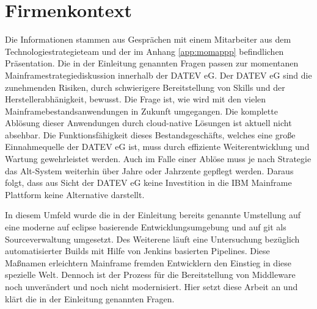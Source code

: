 \chapter{Firmenkontext}\label{ch:Firmenkontext}
Die Informationen stammen aus Gesprächen mit einem Mitarbeiter aus dem Technologiestrategieteam und der im Anhang \ref{app:momappp} befindlichen Präsentation.
Die in der Einleitung genannten Fragen passen zur momentanen Mainframestrategiediskussion innerhalb der DATEV eG.
Der DATEV eG sind die zunehmenden Risiken, durch schwierigere Bereitstellung von Skills und der Herstellerabhänigkeit, bewusst.
Die Frage ist, wie wird mit den vielen Mainframebestandsanwendungen in Zukunft umgegangen.
Die komplette Ablösung dieser Anwendungen durch cloud-native Lösungen ist aktuell nicht absehbar.
Die Funktionsfähigkeit dieses Bestandsgeschäfts, welches eine große Einnahmequelle der DATEV eG ist, muss durch effiziente Weiterentwicklung und Wartung gewehrleistet werden.
Auch im Falle einer Ablöse muss je nach Strategie das Alt-System weiterhin über Jahre oder Jahrzente gepflegt werden.
Daraus folgt, dass aus Sicht der DATEV eG keine Investition in die IBM Mainframe Plattform keine Alternative darstellt.

In diesem Umfeld wurde die in der Einleitung bereits genannte Umstellung auf eine moderne auf eclipse basierende Entwicklungsumgebung und auf git als Sourceverwaltung umgesetzt.
Des Weiterene läuft eine Untersuchung bezüglich automatisierter Builds mit Hilfe von Jenkins basierten Pipelines.
Diese Maßnamen erleichtern Mainframe fremden Entwicklern den Einstieg in diese spezielle Welt.
Dennoch ist der Prozess für die Bereitstellung von Middleware noch unverändert und noch nicht modernisiert.
Hier setzt diese Arbeit an und klärt die in der Einleitung genannten Fragen.


